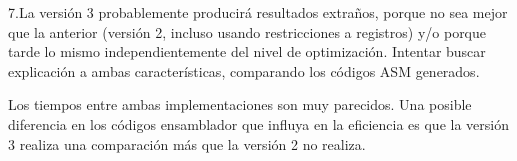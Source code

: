 \begin{ejercicio}{7.La versión 3 probablemente producirá resultados
    extraños, porque no sea mejor que la anterior (versión 2, incluso
    usando restricciones a registros) y/o porque tarde lo mismo
    independientemente del nivel de optimización. Intentar buscar
    explicación a ambas características, comparando los códigos ASM
    generados.}

  Los tiempos entre ambas implementaciones son muy parecidos. Una
  posible diferencia en los códigos ensamblador que influya en la
  eficiencia es que la versión 3 realiza una comparación más que la
  versión 2 no realiza.
  
\end{ejercicio}